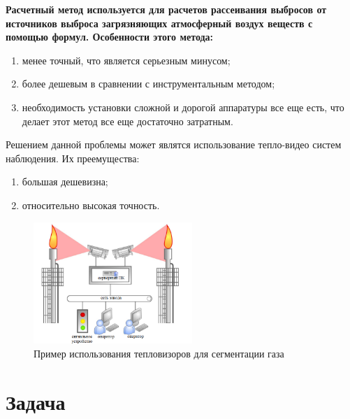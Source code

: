 \documentclass[t]{beamer}
\begin{document}
	\begin{frame}
		\bfseries Расчетный метод \normalfont используется для расчетов рассеивания выбросов от источников выброса загрязняющих атмосферный воздух веществ с помощью формул. Особенности этого метода:
		\begin{enumerate}
			\justifying
			\item менее точный, что является серьезным минусом;
			\item более дешевым в сравнении с инструментальным методом; 
			\item необходимость установки сложной и дорогой аппаратуры все еще есть, что делает этот метод все еще достаточно затратным.
		\end{enumerate}
	\end{frame}

	\begin{frame}
		Решением данной проблемы может являтся использование тепло-видео систем наблюдения. Их преемущества: 
		\begin{enumerate}
			\justifying
			\item большая дешевизна;
			\item относительно высокая точность.
		\end{enumerate}
		\begin{figure}[h!]
			\centering
			\includegraphics[width = 6cm]{image/controlGasSystem}	
			\caption{Пример использования тепловизоров для сегментации газа}
			\label{fig:controlGasSystem}
		\end{figure}
	\end{frame}

\section{Задача}
\end{document}
